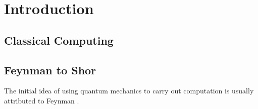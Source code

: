 \chapter{Introduction}

\section{Classical Computing}

\section{Feynman to Shor}
The initial idea of using quantum mechanics to carry out computation is usually attributed to Feynman \cite{feynman}.
